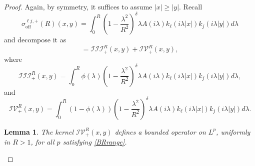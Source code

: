 \documentclass[12pt]{amsart}
\newtheorem{lemma}[theorem]{Lemma}
\begin{document}
\begin{proof}
Again, by symmetry, it suffices to assume $|x|\ge |y|$. Recall
\begin{equation*}
\sigma_{\mathrm{off}}^{\ell j,+}(R)(x,y)
=
\int_0^R
\left(1-\frac{\lambda^2}{R^2}\right)^\delta
\lambda A(i\lambda)k_\ell(i\lambda|x|)k_j(i\lambda|y|) d\lambda
\end{equation*}
and decompose it as
\begin{equation*}
=\mathcal{III}_{+}^R(x,y)+\mathcal{IV}_{+}^R(x,y),
\end{equation*}
where
\begin{equation*}
    \mathcal{III}_{+}^R(x,y)
=
\int_0^R
\phi(\lambda)
\left(1-\frac{\lambda^2}{R^2}\right)^\delta
\lambda A(i\lambda)k_\ell(i\lambda|x|)k_j(i\lambda|y|) d\lambda,
\end{equation*}
and
\begin{equation*}
\mathcal{IV}_{+}^R(x,y)
=
\int_0^R
(1-\phi(\lambda))
\left(1-\frac{\lambda^2}{R^2}\right)^\delta
\lambda A(i\lambda)k_\ell(i\lambda|x|)k_j(i\lambda|y|) d\lambda.    
\end{equation*}







\begin{lemma}\label{lem:high-largeR}
The kernel $\mathcal{IV}_{+}^R(x,y)$ defines a bounded operator on $L^p$, uniformly in $R>1$, for all $p$ satisfying \eqref{BRrange}.
\end{lemma}


\end{proof}
\end{document}
